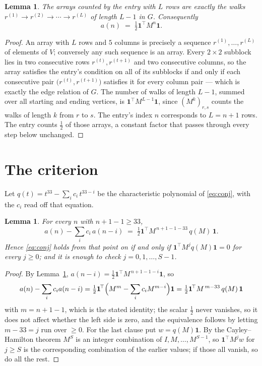 \documentclass[11pt,a4paper]{article}
\theoremstyle{plain}
\newtheorem{lemma}[theorem]{Lemma}
\theoremstyle{definition}
\begin{document}
\begin{lemma}\label{lem:walk}
The arrays counted by the entry with $L$ rows are exactly the walks
$r^{(1)}\to r^{(2)}\to\cdots\to r^{(L)}$ of length $L-1$ in $G$. Consequently
\[
a(n)\;=\;\tfrac1{2}\mathbf{1}^{\!\top}M^{n}\mathbf{1} .
\]
\end{lemma}

\begin{proof}
An array with $L$ rows and $5$ columns is precisely a sequence
$r^{(1)},\dots,r^{(L)}$ of elements of $V$; conversely any such sequence is an array.
Every $2\times2$ subblock lies in two consecutive rows $r^{(t)},r^{(t+1)}$ and two
consecutive columns, so the array satisfies the entry's condition on all of its subblocks
if and only if each consecutive pair $\bigl(r^{(t)},r^{(t+1)}\bigr)$ satisfies it for
every column pair --- which is exactly the edge relation of $G$. The number of walks of
length $L-1$, summed over all starting and ending vertices, is
$\mathbf{1}^{\!\top}M^{L-1}\mathbf{1}$, since $(M^{k})_{r,s}$ counts the walks of
length $k$ from $r$ to $s$. The entry's index $n$ corresponds to $L=n+1$ rows. The entry counts $\tfrac1{2}$ of those arrays, a constant factor that passes through every step below unchanged.
\end{proof}

\section{The criterion}

Let $q(t)=t^{33}-\sum_i c_i\,t^{33-i}$ be the characteristic polynomial of
\eqref{eq:conj}, with the $c_i$ read off that equation.

\begin{lemma}\label{lem:crit}
For every $n$ with $n+1-1\ge33$,
\[
a(n)-\sum_i c_i\,a(n-i)\;=\;\tfrac1{2}\mathbf{1}^{\!\top}M^{\,n+1-1-33}\,q(M)\,\mathbf{1} .
\]
Hence \eqref{eq:conj} holds from that point on if and only if
$\mathbf{1}^{\!\top}M^{j}q(M)\mathbf{1}=0$ for every $j\ge0$; and it is enough to check
$j=0,1,\dots,S-1$.
\end{lemma}

\begin{proof}
By Lemma~\ref{lem:walk}, $a(n-i)=\tfrac1{2}\mathbf{1}^{\!\top}M^{\,n+1-1-i}\mathbf{1}$, so
\[
a(n)-\sum_i c_i a(n-i)
=\tfrac1{2}\mathbf{1}^{\!\top}\Bigl(M^{m}-\sum_i c_i M^{m-i}\Bigr)\mathbf{1}
=\tfrac1{2}\mathbf{1}^{\!\top}M^{\,m-33}\,q(M)\,\mathbf{1}
\]
with $m=n+1-1$, which is the stated identity; the scalar $\tfrac1{2}$ never vanishes, so it does not affect whether the left side is zero, and the equivalence follows by letting
$m-33=j$ run over $\ge0$. For the last clause put $w=q(M)\mathbf{1}$. By the
Cayley--Hamilton theorem $M^{S}$ is an integer combination of $I,M,\dots,M^{S-1}$, so
$\mathbf{1}^{\!\top}M^{j}w$ for $j\ge S$ is the corresponding combination of the earlier
values; if those all vanish, so do all the rest.
\end{proof}
\end{document}
